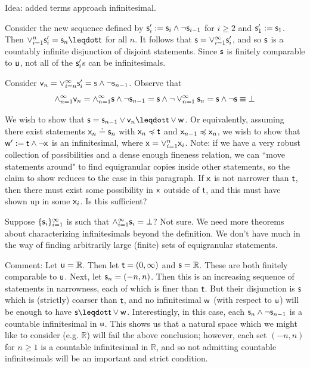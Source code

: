 \documentclass[10pt, onecolumn, nofootinbib]{revtex4-1}
\begin{document}
Idea: added terms approach infinitesimal. 

Consider the new sequence defined by $\stmt'_i := \stmt_i \AND \NOT\stmt_{i-1}$ for $i\geq2$ and $\stmt'_1 := \stmt_1$. Then $\OR_{i=1}^n\stmt'_i = \stmt_n\finer\stmt[t]$ for all $n$. It follows that $\stmt = \OR_{i=1}^{\infty}\stmt'_i$, and so $\stmt$ is a countably infinite disjunction of disjoint statements. Since $\stmt$ is finitely comparable to $\stmt[u]$, not all of the $\stmt_i'$s can be infinitesimals. 

Consider $\stmt[v]_n = \OR_{i=n}^{\infty}\stmt'_i = \stmt \AND\NOT\stmt_{n-1}$. Observe that $$\AND_{n=1}^{\infty}\stmt[v]_n = \AND_{n=1}^{\infty}\stmt\AND\NOT\stmt_{n-1} = \stmt\AND\NOT\OR_{n=1}^{\infty}\stmt_n = \stmt\AND\NOT\stmt \equiv \impossibility$$

We wish to show that $\stmt = \stmt_{n-1}\OR\stmt[v]_n\finer \stmt[t]\OR \stmt[w]$. Or equivalently, assuming there exist statements $\stmt[x]_n\eqgran\stmt_n$ with $\stmt[x]_n\narrower\stmt[t]$ and $\stmt[x]_{n-1}\narrower\stmt[x]_n$, we wish to show that $\stmt[w]' := \stmt[t]\AND\NOT\stmt[x]$ is an infinitesimal, where $\stmt[x]=\OR_{i=1}^n\stmt[x]_i$. Note: if we have a very robust collection of possibilities and a dense enough fineness relation, we can ``move statements around" to find equigranular copies inside other statements, so the claim to show reduces to the case in this paragraph. If $\stmt[x]$ is not narrower than $\stmt[t]$, then there must exist some possibility in $\stmt[x]$ outside of $\stmt[t]$, and this must have shown up in some $\stmt[x]_i$. Is this sufficient? 

Suppose $\{\stmt_i\}_{i=1}^{\infty}$ is such that $\AND_{i=1}^{\infty}\stmt_i = \impossibility$? Not sure. We need more theorems about characterizing infinitesimals beyond the definition. We don't have much in the way of finding arbitrarily large (finite) sets of equigranular statements. 

Comment: Let $\stmt[u] = \mathbb{R}$. Then let $\stmt[t] = (0,\infty)$ and $\stmt = \mathbb{R}$. These are both finitely comparable to $\stmt[u]$. Next, let $\stmt_n = (-n,n)$. Then this is an increasing sequence of statements in narrowness, each of which is finer than $\stmt[t]$. But their disjunction is $\stmt$ which is (strictly) coarser than $\stmt[t]$, and no infinitesimal $\stmt[w]$ (with respect to $\stmt[u]$) will be enough to have $\stmt\finer\stmt[t]\OR \stmt[w]$. Interestingly, in this case, each $\stmt_n\AND\NOT\stmt_{n-1}$ is a countable infinitesimal in $\stmt[u]$. This shows us that a natural space which we might like to consider (e.g. $\mathbb{R}$) will fail the above conclusion; however, each set $(-n,n)$ for $n\geq1$ is a countable infinitesimal in $\mathbb{R}$, and so not admitting countable infinitesimals will be an important and strict condition. 
\end{document}
